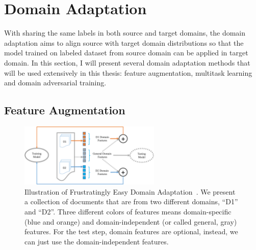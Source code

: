 

\section{Domain Adaptation}
\label{chap2:sec:domain_adpt}
With sharing the same labels in both source and target domains, the domain adaptation aims to align source with target domain distributions so that the model trained on labeled dataset from source domain can be applied in target domain.
In this section, I will present several domain adaptation methods that will be used extensively in this thesis: feature augmentation, multitask learning and domain adversarial training.


\subsection{Feature Augmentation}
\label{chap2:subsec:feaaug}

\begin{figure}[tb!]
\centering
\includegraphics[width=0.60\textwidth]{images/chapter2/feature-aug.pdf}
\caption{Illustration of Frustratingly Easy Domain Adaptation~\cite{daume2007frustratingly}. We present a collection of documents that are from two different domains, ``D1'' and ``D2''. Three different colors of features means domain-specific (blue and orange) and domain-independent (or called general, gray) features. For the test step, domain features are optional, instead, we can just use the domain-independent features.}
\label{chap2:fig:aug}
\end{figure}

